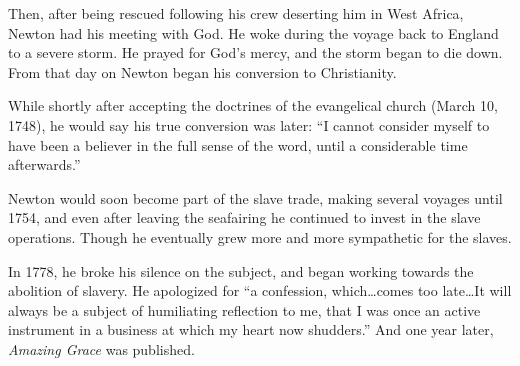 \documentclass[10pt,a4paper,oneside,twocolumn]{book}
\begin{document}
Then, after being rescued following his crew deserting him in West Africa, Newton had his meeting with God. He woke during the voyage back to England to a severe storm. He prayed for God's mercy, and the storm began to die down. From that day on Newton began his conversion to Christianity.

While shortly after accepting the doctrines of the evangelical church (March 10, 1748), he would say his true conversion was later: ``I cannot consider myself to have been a believer in the full sense of the word, until a considerable time afterwards.''

Newton would soon become part of the slave trade, making several voyages until 1754, and even after leaving the seafairing he continued to invest in the slave operations. Though he eventually grew more and more sympathetic for the slaves.

In 1778, he broke his silence on the subject, and began working towards the abolition of slavery. He apologized for ``a confession, which\ldots comes too late\ldots It will always be a subject of humiliating reflection to me, that I was once an active instrument in a business at which my heart now shudders.'' And one year later, \textit{Amazing Grace} was published.
\end{document}
